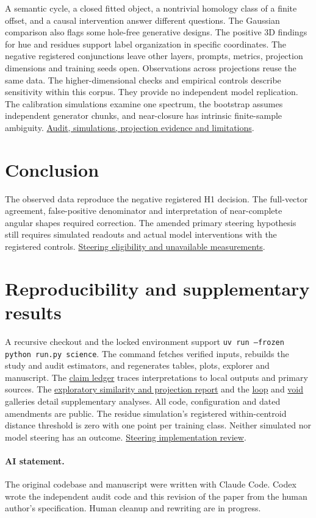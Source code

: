 \documentclass[10pt]{article}
\newcommand{\evidence}[2]{\href{https://github.com/BurnyCoder/topology-of-neural-geometry-in-llm-mechanistic-interpretability/blob/main/#1}{#2}}
\begin{document}
A semantic cycle, a closed fitted object, a nontrivial homology class of a finite offset, and a causal intervention answer different questions. The Gaussian comparison also flags some hole-free generative designs. The positive 3D findings for hue and residues support label organization in specific coordinates. The negative registered conjunctions leave other layers, prompts, metrics, projection dimensions and training seeds open. Observations across projections reuse the same data. The higher-dimensional checks and empirical controls describe sensitivity within this corpus. They provide no independent model replication. The calibration simulations examine one spectrum, the bootstrap assumes independent generator chunks, and near-closure has intrinsic finite-sample ambiguity. \evidence{reports/reviews/2026-11-26-scientific-audit.md}{Audit, simulations, projection evidence and limitations}.

\section{Conclusion}
The observed data reproduce the negative registered H1 decision. The full-vector agreement, false-positive denominator and interpretation of near-complete angular shapes required correction. The amended primary steering hypothesis still requires simulated readouts and actual model interventions with the registered controls. \evidence{results/science/h6_datasets.csv}{Steering eligibility and unavailable measurements}.

\appendix
\section{Reproducibility and supplementary results}
A recursive checkout and the locked environment support \texttt{uv run --frozen python run.py science}. The command fetches verified inputs, rebuilds the study and audit estimators, and regenerates tables, plots, explorer and manuscript. The \evidence{reports/reviews/2026-11-26-claims.tsv}{claim ledger} traces interpretations to local outputs and primary sources. The \evidence{reports/exp4_exp5.md}{exploratory similarity and projection report} and the \evidence{reports/loops.md}{loop} and \evidence{reports/voids.md}{void} galleries detail supplementary analyses. All code, configuration and dated amendments are public. The residue simulation's registered within-centroid distance threshold is zero with one point per training class. Neither simulated nor model steering has an outcome. \evidence{reports/exp6_steering.md}{Steering implementation review}.




\paragraph{AI statement.} The original codebase and manuscript were written with Claude Code. Codex wrote the independent audit code and this revision of the paper from the human author's specification. Human cleanup and rewriting are in progress.
\end{document}
